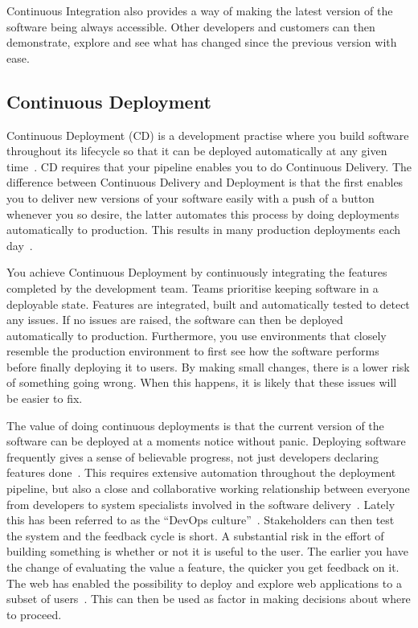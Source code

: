 \documentclass[english]{tktltiki2}
\begin{document}
Continuous Integration also provides a way of making the latest version of the software being always accessible. Other developers and customers can then demonstrate, explore and see what has changed since the previous version with ease.

\subsection{Continuous Deployment}

Continuous Deployment (CD) is a development practise where you build software throughout its lifecycle so that it can be deployed automatically at any given time~\cite{Fow13a}. CD requires that your pipeline enables you to do Continuous Delivery. The difference between Continuous Delivery and Deployment is that the first enables you to deliver new versions of your software easily with a push of a button whenever you so desire, the latter automates this process by doing deployments automatically to production. This results in many production deployments each day~\cite{OR11, Sny13, Rub14}.

You achieve Continuous Deployment by continuously integrating the features completed by the development team. Teams prioritise keeping software in a deployable state. Features are integrated, built and automatically tested to detect any issues. If no issues are raised, the software can then be deployed automatically to production. Furthermore, you use environments that closely resemble the production environment to first see how the software performs before finally deploying it to users. By making small changes, there is a lower risk of something going wrong. When this happens, it is likely that these issues will be easier to fix.

The value of doing continuous deployments is that the current version of the software can be deployed at a moments notice without panic. Deploying software frequently gives a sense of believable progress, not just developers declaring features done~\cite{Fow13a}. This requires extensive automation throughout the deployment pipeline, but also a close and collaborative working relationship between everyone from developers to system specialists involved in the software delivery~\cite{Fow13a}. Lately this has been referred to as the “DevOps culture”~\cite{Fow13a}. Stakeholders can then test the system and the feedback cycle is short. A substantial risk in the effort of building something is whether or not it is useful to the user. The earlier you have the change of evaluating the value a feature, the quicker you get feedback on it. The web has enabled the possibility to deploy and explore web applications to a subset of users~\cite{Fow06, Fow13a}. This can then be used as factor in making decisions about where to proceed.
\end{document}
